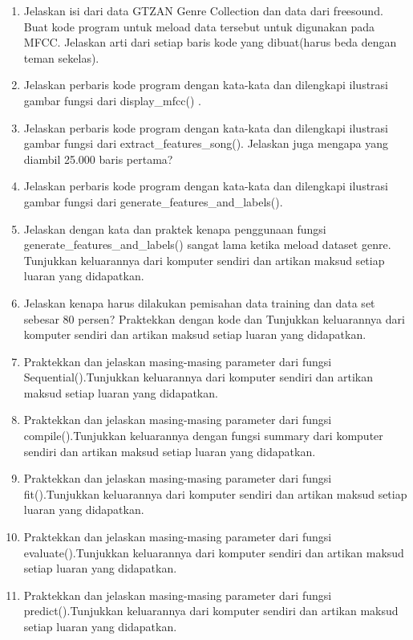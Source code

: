 \begin{enumerate}
\item Jelaskan isi dari data GTZAN Genre Collection dan data dari freesound. Buat kode program untuk meload data tersebut untuk digunakan pada MFCC. Jelaskan arti dari setiap baris kode yang dibuat(harus beda dengan teman sekelas).

\item Jelaskan perbaris kode program dengan kata-kata dan dilengkapi ilustrasi gambar fungsi dari display\_mfcc() .

\item Jelaskan perbaris kode program dengan kata-kata dan dilengkapi ilustrasi gambar fungsi dari extract\_features\_song(). Jelaskan juga mengapa yang diambil 25.000 baris pertama?

\item Jelaskan perbaris kode program dengan kata-kata dan dilengkapi ilustrasi gambar fungsi dari generate\_features\_and\_labels().

\item Jelaskan dengan kata dan praktek kenapa penggunaan fungsi generate\_features\_and\_labels() sangat lama ketika meload dataset genre. Tunjukkan keluarannya dari komputer sendiri dan artikan maksud setiap luaran yang didapatkan.

\item Jelaskan kenapa harus dilakukan pemisahan data training dan data set sebesar 80 persen? Praktekkan dengan kode dan Tunjukkan keluarannya dari komputer sendiri dan artikan maksud setiap luaran yang didapatkan.

\item Praktekkan dan jelaskan masing-masing parameter dari fungsi Sequential().Tunjukkan keluarannya dari komputer sendiri dan artikan maksud setiap luaran yang didapatkan.

\item Praktekkan dan jelaskan masing-masing parameter dari fungsi compile().Tunjukkan keluarannya dengan fungsi summary dari komputer sendiri dan artikan maksud setiap luaran yang didapatkan.

\item Praktekkan dan jelaskan masing-masing parameter dari fungsi fit().Tunjukkan keluarannya dari komputer sendiri dan artikan maksud setiap luaran yang didapatkan.

\item Praktekkan dan jelaskan masing-masing parameter dari fungsi evaluate().Tunjukkan keluarannya dari komputer sendiri dan artikan maksud setiap luaran yang didapatkan.

\item Praktekkan dan jelaskan masing-masing parameter dari fungsi predict().Tunjukkan keluarannya dari komputer sendiri dan artikan maksud setiap luaran yang didapatkan.

\end{enumerate}


